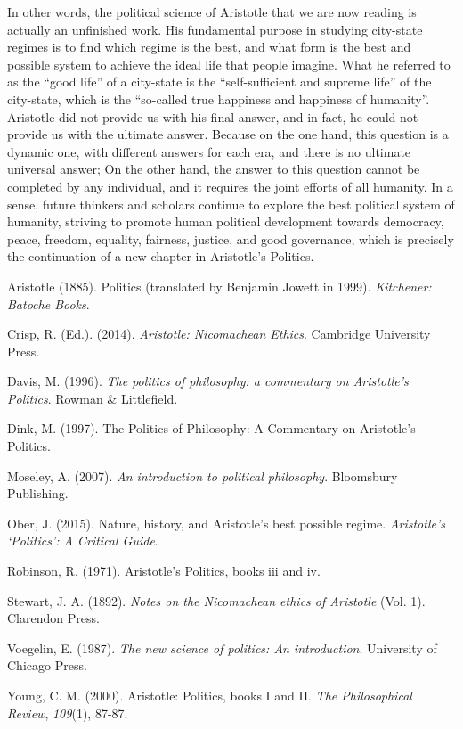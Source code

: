 \documentclass[11pt]{article}
\begin{document}
In other words, the political science of Aristotle that we are now reading is actually an unfinished work. His fundamental purpose in studying city-state regimes is to find which regime is the best, and what form is the best and possible system to achieve the ideal life that people imagine. What he referred to as the “good life” of a city-state is the “self-sufficient and supreme life” of the city-state, which is the “so-called true happiness and happiness of humanity”. Aristotle did not provide us with his final answer, and in fact, he could not provide us with the ultimate answer. Because on the one hand, this question is a dynamic one, with different answers for each era, and there is no ultimate universal answer; On the other hand, the answer to this question cannot be completed by any individual, and it requires the joint efforts of all humanity. In a sense, future thinkers and scholars continue to explore the best political system of humanity, striving to promote human political development towards democracy, peace, freedom, equality, fairness, justice, and good governance, which is precisely the continuation of a new chapter in Aristotle's Politics.

\begin{references}
\item Aristotle (1885). Politics (translated by Benjamin Jowett in 1999). \textit{Kitchener: Batoche Books}.
\item Crisp, R. (Ed.). (2014). \textit{Aristotle: Nicomachean Ethics}. Cambridge University Press.
\item Davis, M. (1996). \textit{The politics of philosophy: a commentary on Aristotle's Politics}. Rowman \& Littlefield.
\item Dink, M. (1997). The Politics of Philosophy: A Commentary on Aristotle's Politics.
\item Moseley, A. (2007). \textit{An introduction to political philosophy}. Bloomsbury Publishing.
\item Ober, J. (2015). Nature, history, and Aristotle's best possible regime. \textit{Aristotle’s ‘Politics’: A Critical Guide}.
\item Robinson, R. (1971). Aristotle's Politics, books iii and iv.
\item Stewart, J. A. (1892). \textit{Notes on the Nicomachean ethics of Aristotle} (Vol. 1). Clarendon Press.
\item Voegelin, E. (1987). \textit{The new science of politics: An introduction}. University of Chicago Press.
\item Young, C. M. (2000). Aristotle: Politics, books I and II. \textit{The Philosophical Review}, \textit{109}(1), 87-87.
\end{references}
\end{document}
